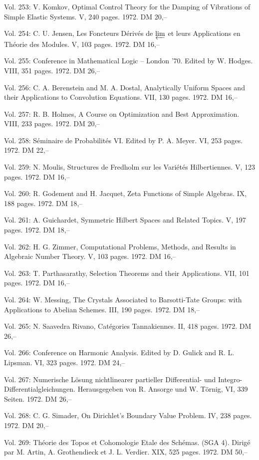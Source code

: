 Vol. 253: V. Komkov, Optimal Control Theory for the Damping of Vibrations of Simple Elastic Systems. V, 240 pages. 1972. DM 20,--

Vol. 254: C. U. Jensen, Les Foncteurs Dérivés de $\varprojlim$ et leurs Applications en Théorie des Modules. V, 103 pages. 1972. DM 16,--

Vol. 255: Conference in Mathematical Logic -- London '70. Edited by W. Hodges. VIII, 351 pages. 1972. DM 26,--

Vol. 256: C. A. Berenstein and M. A. Dostal, Analytically Uniform Spaces and their Applications to Convolution Equations. VII, 130 pages. 1972. DM 16,--

Vol. 257: R. B. Holmes, A Course on Optimization and Best Approximation. VIII, 233 pages. 1972. DM 20,--

Vol. 258: Séminaire de Probabilités VI. Edited by P. A. Meyer. VI, 253 pages. 1972. DM 22,--

Vol. 259: N. Moulis, Structures de Fredholm sur les Variétés Hilbertiennes. V, 123 pages. 1972. DM 16,--

Vol. 260: R. Godement and H. Jacquet, Zeta Functions of Simple Algebras. IX, 188 pages. 1972. DM 18,--

Vol. 261: A. Guichardet, Symmetric Hilbert Spaces and Related Topics. V, 197 pages. 1972. DM 18,--

Vol. 262: H. G. Zimmer, Computational Problems, Methods, and Results in Algebraic Number Theory. V, 103 pages. 1972. DM 16,--

Vol. 263: T. Parthasarathy, Selection Theorems and their Applications. VII, 101 pages. 1972. DM 16,--

Vol. 264: W. Messing, The Crystals Associated to Barsotti-Tate Groups: with Applications to Abelian Schemes. III, 190 pages. 1972. DM 18,--

Vol. 265: N. Saavedra Rivano, Catégories Tannakiennes. II, 418 pages. 1972. DM 26,--

Vol. 266: Conference on Harmonic Analysis. Edited by D. Gulick and R. L. Lipsman. VI, 323 pages. 1972. DM 24,--

Vol. 267: Numerische Lösung nichtlinearer partieller Differential- und Integro-Differentialgleichungen. Herausgegeben von R. Ansorge und W. Törnig, VI, 339 Seiten. 1972. DM 26,--

Vol. 268: C. G. Simader, On Dirichlet's Boundary Value Problem. IV, 238 pages. 1972. DM 20,--

Vol. 269: Théorie des Topos et Cohomologie Etale des Schémas. (SGA 4). Dirigé par M. Artin, A. Grothendieck et J. L. Verdier. XIX, 525 pages. 1972. DM 50,--

